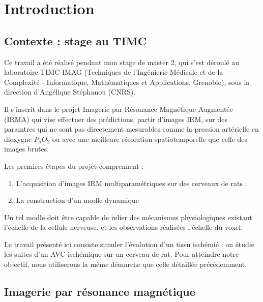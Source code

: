 \section{Introduction}

\subsection{Contexte : stage au TIMC}

Ce travail a \'et\'e r\'ealis\'e pendant mon stage de master 2, qui s'est d\'eroul\'e au laboratoire TIMC-IMAG %
(Techniques de l'Ingénierie M\'edicale et de la Complexit\'e - Informatique, Mathématiques et Applications, Grenoble), %
sous la direction d'Angélique Stéphanou (CNRS). 

\par
Il s'inscrit dans le projet Imagerie par Résonance Magn\'etique Augment\'ee (IRMA) qui vise  effectuer des pr\'edictions, %
 partir d'images IRM, sur des paramtres qui ne sont pas directement mesurables comme la pression art\'erielle en dioxygne $P_aO_2$ %
ou avec une meilleure r\'esolution spatiotemporelle que celle des images brutes.

\par
Les premires \'etapes du projet comprennent :
\begin{enumerate}
\item L'acquisition d'images IRM multiparam\'etriques sur des cerveaux de rats ;
\item La construction d'un modle dynamique 
\end{enumerate}

Un tel modle doit \^etre capable de relier des m\'ecanismes physiologiques existant  l'\'echelle de la cellule nerveuse, %
et les observations r\'ealis\'ees  l'\'echelle du voxel.

\par
Le travail pr\'esent\'e ici consiste  simuler l'\'evolution d'un tissu isch\'emi\'e : %
on \'etudie les suites d'un AVC isch\'emique sur un cerveau de rat. %
Pour atteindre notre objectif, nous utiliserons la m\^eme d\'emarche que celle d\'etaill\'ee pr\'ec\'edemment.

\subsection{Imagerie par r\'esonance magn\'etique}%

